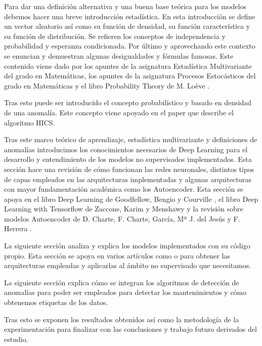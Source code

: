 Para dar una definición alternativa y una buena base teórica para los modelos debemos hacer una breve introducción estadística. En esta introducción se define un vector aleatorio así como su función de densidad, su función característica y su función de distribución. Se refieren los conceptos de independencia y probabilidad y esperanza condicionada. Por último y aprovechando este contexto se enuncian y demuestran algunas desigualdades y fórmulas famosas. Este contenido viene dado por los apuntes de la asignatura Estadística Multivariante del grado en Matemáticas, los apuntes de la asignatura Procesos Estocásticos del grado en Matemáticas y el libro Probability Theory de M. Loève \cite{m._loeve_probability_1977}.

Tras esto puede ser introducido el concepto probabilístico y basado en densidad de una anomalía. Este concepto viene apoyado en el paper \cite{fabian_keller_hics:_2012} que describe el algoritmo HICS.

Tras este marco teórico de aprendizaje, estadística multivariante y definiciones de anomalías introducimos los conocimientos necesarios de Deep Learning para el desarrollo y entendimiento de los modelos no supervisados implementados. Esta sección hace una revisión de cómo funcionan las redes neuronales, distintos tipos de capas empleados en las arquitecturas implementadas y algunas arquitecturas con mayor fundamentación académica como los Autoencoder. Esta sección se apoya en el libro Deep Learning de Goodfellow, Bengio y Courville \cite{goodfellow_deep_2016}, el libro Deep Learning with Tensorflow de Zaccone, Karim y Menshawy \cite{giancarlo_deep_2017} y la revisión sobre modelos Autoencoder de D. Charte, F. Charte, García, Mª J. del Jesús y F. Herrera \cite{david_practical_2018}.

La siguiente sección analiza y explica los modelos implementados con su código propio. Esta sección se apoya en varios artículos como \cite{lih_oh_automated_2018} o \cite{david_practical_2018} para obtener las arquitecturas empleadas y aplicarlas al ámbito no supervisado que necesitamos.

La siguiente sección explica cómo se integran los algoritmos de detección de anomalías para poder ser empleados para detectar los mantenimientos y cómo obtenemos etiquetas de los datos.

Tras esto se exponen los resultados obtenidos así como la metodología de la experimentación para finalizar con las conclusiones y trabajo futuro derivados del estudio.


